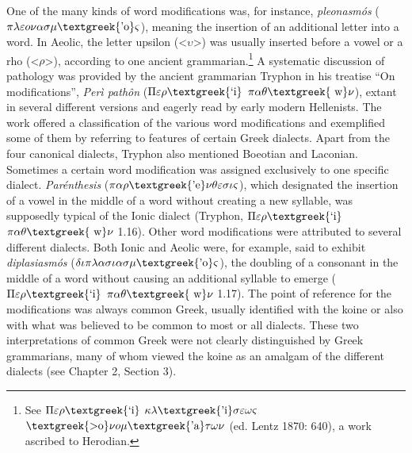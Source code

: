\documentclass[12pt]{article}
\newenvironment{styleCatalogusnotities}{\renewcommand\baselinestretch{1.25}\setlength\leftskip{0in}\setlength\rightskip{0in}\setlength\parindent{0in}\setlength\parfillskip{0pt plus 1fil}\setlength\parskip{0in plus 1pt}\writerlistparindent\writerlistleftskip\leavevmode\normalfont\normalsize\writerlistlabel\ignorespaces}{\unskip\vspace{0in plus 1pt}\par}
\newcommand\writerlistleftskip{}
\newcommand\writerlistparindent{}
\newcommand\writerlistlabel{}
\begin{document}
\begin{styleCatalogusnotities}
One of the many kinds of word modifications was, for instance, \textit{pleonasmós} ($\pi \lambda \varepsilon o\nu \alpha \sigma \mu \text{\textgreek{'o}}\varsigma $), meaning the insertion of an additional letter into a word. In Aeolic, the letter upsilon ({\textless}$\upsilon ${\textgreater}) was usually inserted before a vowel or a rho ({\textless}$\rho ${\textgreater}), according to one ancient grammarian.\footnote{\textrm{ See $\Pi \varepsilon \rho \text{\textgreek{`i}}$ $\kappa \lambda \text{\textgreek{'i}}\sigma \varepsilon \omega \varsigma $ $\text{\textgreek{>o}}\nu o\mu \text{\textgreek{'a}}\tau \omega \nu $ (ed. Lentz 1870: 640), a work ascribed to Herodian.}} A systematic discussion of pathology was provided by the ancient grammarian Tryphon in his treatise “On modifications”, \textit{Perì pathôn} ($\Pi \varepsilon \rho \text{\textgreek{`i}}$ $\pi \alpha \theta \text{\textgreek{~w}}\nu $), extant in several different versions and eagerly read by early modern Hellenists. The work offered a classification of the various word modifications and exemplified some of them by referring to features of certain Greek dialects. Apart from the four canonical dialects, Tryphon also mentioned Boeotian and Laconian. Sometimes a certain word modification was assigned exclusively to one specific dialect. \textit{Parénthesis} ($\pi \alpha \rho \text{\textgreek{'e}}\nu \theta \varepsilon \sigma \iota \varsigma $), which designated the insertion of a vowel in the middle of a word without creating a new syllable, was supposedly typical of the Ionic dialect (Tryphon, $\Pi \varepsilon \rho \text{\textgreek{`i}}$ $\pi \alpha \theta \text{\textgreek{~w}}\nu $ 1.16). Other word modifications were attributed to several different dialects. Both Ionic and Aeolic were, for example, said to exhibit \textit{diplasiasmós} ($\delta \iota \pi \lambda \alpha \sigma \iota \alpha \sigma \mu \text{\textgreek{'o}}\varsigma $), the doubling of a consonant in the middle of a word without causing an additional syllable to emerge ($\Pi \varepsilon \rho \text{\textgreek{`i}}$ $\pi \alpha \theta \text{\textgreek{~w}}\nu $ 1.17). The point of reference for the modifications was always common Greek, usually identified with the koine or also with what was believed to be common to most or all dialects. These two interpretations of common Greek were not clearly distinguished by Greek grammarians, many of whom viewed the koine as an amalgam of the different dialects (see Chapter 2, Section 3).
\end{styleCatalogusnotities}
\end{document}
